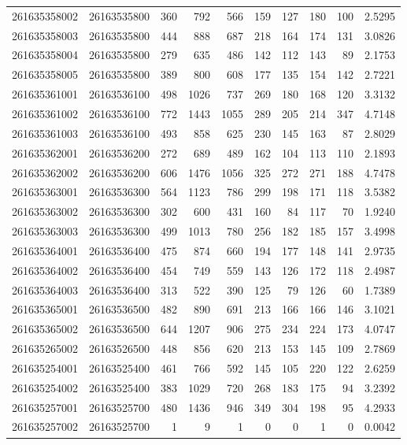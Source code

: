 \documentclass[
  11pt,
]{article}
\begin{document}
\begin{longtable}[t]{llrrrrrrrr}
261635358002 & 26163535800 & 360 & 792 & 566 & 159 & 127 & 180 & 100 & 2.5295\\
261635358003 & 26163535800 & 444 & 888 & 687 & 218 & 164 & 174 & 131 & 3.0826\\
261635358004 & 26163535800 & 279 & 635 & 486 & 142 & 112 & 143 & 89 & 2.1753\\
261635358005 & 26163535800 & 389 & 800 & 608 & 177 & 135 & 154 & 142 & 2.7221\\
261635361001 & 26163536100 & 498 & 1026 & 737 & 269 & 180 & 168 & 120 & 3.3132\\
261635361002 & 26163536100 & 772 & 1443 & 1055 & 289 & 205 & 214 & 347 & 4.7148\\
261635361003 & 26163536100 & 493 & 858 & 625 & 230 & 145 & 163 & 87 & 2.8029\\
261635362001 & 26163536200 & 272 & 689 & 489 & 162 & 104 & 113 & 110 & 2.1893\\
261635362002 & 26163536200 & 606 & 1476 & 1056 & 325 & 272 & 271 & 188 & 4.7478\\
261635363001 & 26163536300 & 564 & 1123 & 786 & 299 & 198 & 171 & 118 & 3.5382\\
261635363002 & 26163536300 & 302 & 600 & 431 & 160 & 84 & 117 & 70 & 1.9240\\
261635363003 & 26163536300 & 499 & 1013 & 780 & 256 & 182 & 185 & 157 & 3.4998\\
261635364001 & 26163536400 & 475 & 874 & 660 & 194 & 177 & 148 & 141 & 2.9735\\
261635364002 & 26163536400 & 454 & 749 & 559 & 143 & 126 & 172 & 118 & 2.4987\\
261635364003 & 26163536400 & 313 & 522 & 390 & 125 & 79 & 126 & 60 & 1.7389\\
261635365001 & 26163536500 & 482 & 890 & 691 & 213 & 166 & 166 & 146 & 3.1021\\
261635365002 & 26163536500 & 644 & 1207 & 906 & 275 & 234 & 224 & 173 & 4.0747\\
261635265002 & 26163526500 & 448 & 856 & 620 & 213 & 153 & 145 & 109 & 2.7869\\
261635254001 & 26163525400 & 461 & 766 & 592 & 145 & 105 & 220 & 122 & 2.6259\\
261635254002 & 26163525400 & 383 & 1029 & 720 & 268 & 183 & 175 & 94 & 3.2392\\
261635257001 & 26163525700 & 480 & 1436 & 946 & 349 & 304 & 198 & 95 & 4.2933\\
261635257002 & 26163525700 & 1 & 9 & 1 & 0 & 0 & 1 & 0 & 0.0042\\

\end{longtable}
\end{document}
